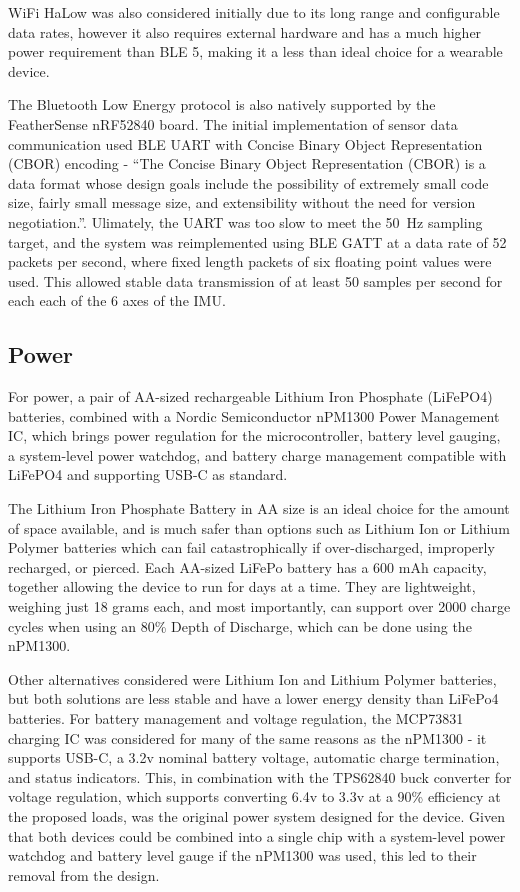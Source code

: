 \documentclass[conference]{IEEEtran}
\begin{document}
WiFi HaLow was also considered initially due to its long range and configurable data rates, however it also requires external hardware and has a much higher power requirement than BLE 5, making it a less than ideal choice for a wearable device.

The Bluetooth Low Energy protocol is also natively supported by the FeatherSense nRF52840 board. The initial implementation of sensor data communication used BLE UART with Concise Binary Object Representation (CBOR) encoding - ``The Concise Binary Object Representation (CBOR) is a data format whose design goals include the possibility of extremely small code size, fairly small message size, and extensibility without the need for version negotiation.''\cite{cbor}. Ulimately, the UART was too slow to meet the 50~Hz sampling target, and the system was reimplemented using BLE GATT at a data rate of 52 packets per second, where fixed length packets of six floating point values were used. This allowed stable data transmission of at least 50 samples per second for each each of the 6 axes of the IMU.

\subsection{Power}

For power, a pair of AA-sized rechargeable Lithium Iron Phosphate (LiFePO4) batteries, combined with a Nordic Semiconductor nPM1300 Power Management IC, which brings power regulation for the microcontroller, battery level gauging, a system-level power watchdog, and battery charge management compatible with LiFePO4 and supporting USB-C as standard.

The Lithium Iron Phosphate Battery in AA size is an ideal choice for the amount of space available, and is much safer than options such as Lithium Ion or Lithium Polymer batteries which can fail catastrophically if over-discharged, improperly recharged, or pierced. Each AA-sized LiFePo battery has a 600 mAh capacity, together allowing the device to run for days at a time. They are lightweight, weighing just 18 grams each, and most importantly, can support over 2000 charge cycles when using an 80\% Depth of Discharge, which can be done using the nPM1300. 

Other alternatives considered were Lithium Ion and Lithium Polymer batteries, but both solutions are less stable and have a lower energy density than LiFePo4 batteries. For battery management and voltage regulation, the MCP73831 charging IC was considered for many of the same reasons as the nPM1300 - it supports USB-C, a 3.2v nominal battery voltage, automatic charge termination, and status indicators. This, in combination with the TPS62840 buck converter for voltage regulation, which supports converting 6.4v to 3.3v at a 90\% efficiency at the proposed loads, was the original power system designed for the device. Given that both devices could be combined into a single chip with a system-level power watchdog and battery level gauge if the nPM1300 was used, this led to their removal from the design.
\end{document}
